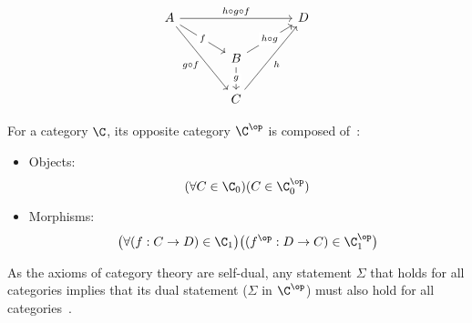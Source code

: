 \begin{example}
  \[\begin{tikzcd}[ampersand replacement=\&,column sep=scriptsize]
    A \&\&\&\& D \\
    \&\& B \\
    \&\& C
    \arrow["f"{description}, from=1-1, to=2-3]
    \arrow["g"{description}, from=2-3, to=3-3]
    \arrow["h"', from=3-3, to=1-5]
    \arrow["{g\circ f}"', from=1-1, to=3-3]
    \arrow["{h\circ g}"{description}, from=2-3, to=1-5]
    \arrow["{h\circ g\circ f}", from=1-1, to=1-5]
  \end{tikzcd}\]
  \vspace{-1.5\baselineskip}
\end{example}

\begin{definition}

  For a category $\C$, its opposite category $\C^\op$ is composed
  of~\parencite[p.~15]{awodey:category_theory}:

  \begin{itemize}
    \item Objects:
      \[(\forall C \in \C_0)
        (C\in \C^\op_0)\]
    \item Morphisms:
      \[\big(\forall (f: C\to D) \in \C_1\big)
        \big((f^\op : D\to C)\in \C^\op_1\big)\]
  \end{itemize}
\end{definition}

\begin{remark}
  As the axioms of category theory are self-dual, any statement $\Sigma$ that
  holds for all categories implies that its dual statement ($\Sigma$ in
  $\C^\op$) must also hold for all
  categories~\parencite[p.~16]{leinster:basic_category_theory}.
\end{remark}





